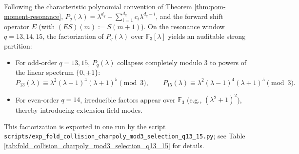 \begin{remark}\label{rem:pom-charpoly-mod3-selection}
Following the characteristic polynomial convention of Theorem \ref{thm:pom-moment-resonance},
\(
P_q(\lambda)=\lambda^{d_q}-\sum_{i=1}^{d_q}c_i\lambda^{d_q-i}
\),
and the forward shift operator \(E\) (with \((ES)(m):=S(m+1)\)).
On the resonance window \(q=13,14,15\), the factorization of \(P_q(\lambda)\) over \(\mathbb{F}_3[\lambda]\) yields an auditable strong partition:
\begin{itemize}
  \item For odd-order \(q=13,15\), \(P_q(\lambda)\) collapses completely modulo \(3\) to powers of the linear spectrum \(\{0,\pm 1\}\):
  \[
  P_{13}(\lambda)\equiv \lambda^2(\lambda-1)^4(\lambda+1)^5\pmod 3,
  \qquad
  P_{15}(\lambda)\equiv \lambda^2(\lambda-1)^4(\lambda+1)^5\pmod 3.
  \]
  \item For even-order \(q=14\), irreducible factors appear over \(\mathbb{F}_3\) (e.g., \((\lambda^2+1)^2\)), thereby introducing extension field modes.
\end{itemize}
This factorization is exported in one run by the script \texttt{scripts/exp\_fold\_collision\_charpoly\_mod3\_selection\_q13\_15.py}; see Table \ref{tab:fold_collision_charpoly_mod3_selection_q13_15} for details.
\end{remark}



